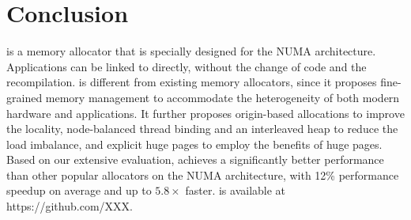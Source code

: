 \section{Conclusion}
\label{sec:conclusion}

\NM{} is a memory allocator that is specially designed for the NUMA architecture. Applications can be linked to \NM{} directly, without the change of code and the recompilation. \NM{} is different from existing memory allocators, since it proposes fine-grained memory management to accommodate the heterogeneity of both modern hardware and applications. It further proposes origin-based allocations to improve the locality, node-balanced thread binding and an interleaved heap to reduce the load imbalance, and explicit huge pages to employ the benefits of huge pages. 
Based on our extensive evaluation, \NM{} achieves a significantly better performance than other popular allocators on the NUMA architecture, with 12\% performance speedup on average and up to $5.8\times$ faster. \NM{} is available at https://github.com/XXX. 
